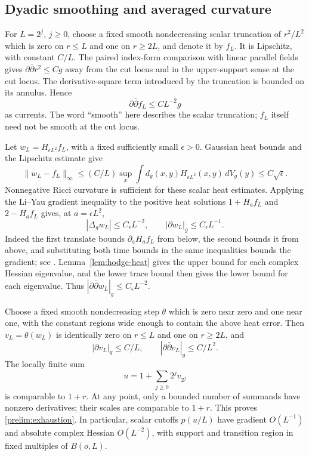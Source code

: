 \documentclass[11pt]{article}
\theoremstyle{definition}
\theoremstyle{remark}
\newcommand{\dd}{\partial\bar\partial}
\numberwithin{equation}{section}
\begin{document}
\subsection{Dyadic smoothing and averaged curvature}

For $L=2^j$, $j\ge0$, choose a fixed smooth nondecreasing scalar
truncation of $r^2/L^2$ which is zero on $r\le L$ and one on
$r\ge2L$, and denote it by $f_L$.  It is Lipschitz, with constant
$C/L$.  The paired index-form comparison with linear parallel fields
gives $\dd r^2\le Cg$ away from the cut locus and in the upper-support
sense at the cut locus.  The derivative-square term introduced by the
truncation is bounded on its annulus.  Hence
\[
 \dd f_L\le CL^{-2}g
\]
as currents.  The word ``smooth'' here describes the scalar
truncation; $f_L$ itself need not be smooth at the cut locus.

Let $w_L=H_{\epsilon L^2}f_L$, with a fixed sufficiently small
$\epsilon>0$.  Gaussian heat bounds and the Lipschitz estimate give
\[
 \|w_L-f_L\|_\infty
 \le (C/L)\sup_x\int d_g(x,y)H_{\epsilon L^2}(x,y)\,dV_g(y)
 \le C\sqrt\epsilon.
\]
Nonnegative Ricci curvature is sufficient for these scalar heat
estimates.  Applying the Li--Yau gradient inequality to the positive
heat solutions $1+H_af_L$ and $2-H_af_L$ gives, at
$a=\epsilon L^2$,
\[
 |\Delta_g w_L|\le C_\epsilon L^{-2},\qquad
 |\partial w_L|_g\le C_\epsilon L^{-1}.
\]
Indeed the first translate bounds $\partial_aH_af_L$ from below,
the second bounds it from above, and substituting both time bounds
in the same inequalities bounds the gradient; see
\cite[Theorem~1.3(i)]{LiYau}.
Lemma~\ref{lem:hodge-heat} gives the upper bound for each complex
Hessian eigenvalue, and the lower trace bound then gives the lower
bound for each eigenvalue.  Thus $|\dd w_L|_g\le C_\epsilon L^{-2}$.

Choose a fixed smooth nondecreasing step $\theta$ which is zero near
zero and one near one, with the constant regions wide enough to
contain the above heat error.  Then $v_L=\theta(w_L)$ is identically
zero on $r\le L$ and one on $r\ge2L$, and
\[
 |\partial v_L|_g\le C/L,\qquad |\dd v_L|_g\le C/L^2.
\]
The locally finite sum
\[
 u=1+\sum_{j\ge0}2^jv_{2^j}
\]
is comparable to $1+r$.  At any point, only a bounded number of
summands have nonzero derivatives; their scales are comparable to
$1+r$.  This proves \eqref{prelim:exhaustion}.  In particular, scalar
cutoffs $p(u/L)$ have gradient $O(L^{-1})$ and absolute complex
Hessian $O(L^{-2})$, with support and transition region in fixed
multiples of $B(o,L)$.
\end{document}
